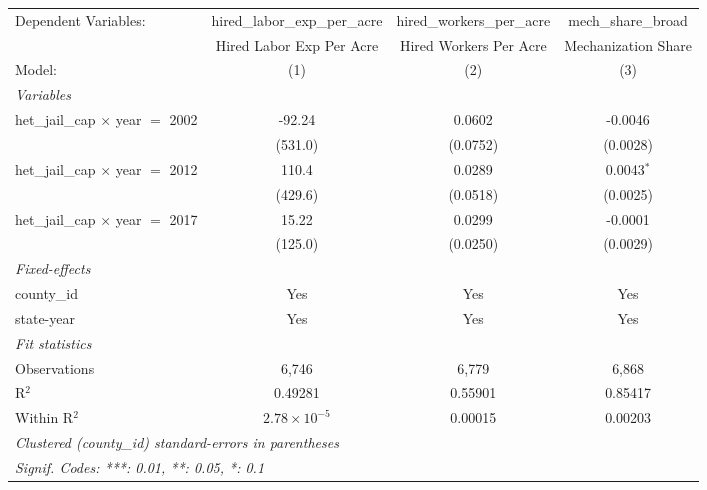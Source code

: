 
\begingroup
\centering
\begin{tabular}{lccc}
   \tabularnewline \midrule \midrule
   Dependent Variables:                     & hired\_labor\_exp\_per\_acre     & hired\_workers\_per\_acre    & mech\_share\_broad\\    
                                            & Hired Labor Exp Per Acre         & Hired Workers Per Acre       & Mechanization Share \\   
   Model:                                   & (1)                              & (2)                          & (3)\\  
   \midrule
   \emph{Variables}\\
   het\_jail\_cap $\times$ year $=$ 2002    & -92.24                           & 0.0602                       & -0.0046\\   
                                            & (531.0)                          & (0.0752)                     & (0.0028)\\   
   het\_jail\_cap $\times$ year $=$ 2012    & 110.4                            & 0.0289                       & 0.0043$^{*}$\\   
                                            & (429.6)                          & (0.0518)                     & (0.0025)\\   
   het\_jail\_cap $\times$ year $=$ 2017    & 15.22                            & 0.0299                       & -0.0001\\   
                                            & (125.0)                          & (0.0250)                     & (0.0029)\\   
   \midrule
   \emph{Fixed-effects}\\
   county\_id                               & Yes                              & Yes                          & Yes\\  
   state-year                               & Yes                              & Yes                          & Yes\\  
   \midrule
   \emph{Fit statistics}\\
   Observations                             & 6,746                            & 6,779                        & 6,868\\  
   R$^2$                                    & 0.49281                          & 0.55901                      & 0.85417\\  
   Within R$^2$                             & $2.78\times 10^{-5}$             & 0.00015                      & 0.00203\\  
   \midrule \midrule
   \multicolumn{4}{l}{\emph{Clustered (county\_id) standard-errors in parentheses}}\\
   \multicolumn{4}{l}{\emph{Signif. Codes: ***: 0.01, **: 0.05, *: 0.1}}\\
\end{tabular}
\par\endgroup


